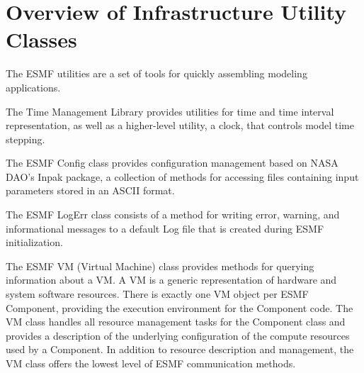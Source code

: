 %


\section{Overview of Infrastructure Utility Classes}

The ESMF utilities are a set of tools for quickly assembling modeling applications.

The Time Management Library provides utilities for time and time interval representation, as well as a higher-level utility, a clock, that controls model time stepping.

The ESMF Config class provides configuration management based on NASA DAO's Inpak package, a collection of methods for accessing files containing input parameters stored in an ASCII format.

The ESMF LogErr class consists of a method for writing error, warning, and informational messages to a default Log file that is created during ESMF initialization.

The ESMF VM (Virtual Machine) class provides methods for querying information about a VM. A VM is a generic representation of hardware and system software resources. There is exactly one VM object per ESMF Component, providing the execution environment for the Component code. The VM class handles all resource management tasks for the Component class and provides a description of the underlying configuration of the compute resources used by a Component.  In addition to resource description and management, the VM class offers the lowest level of ESMF communication methods.
